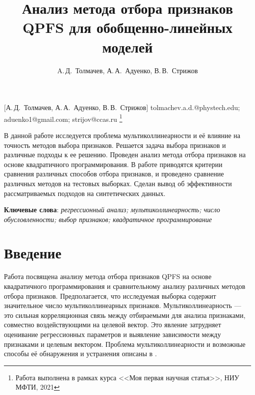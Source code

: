 \documentclass[12pt, twoside]{article}
\begin{document}
\title
    [Анализ метода отбора признаков QPFS для обобщенно-линейных моделей] %
    {Анализ метода отбора признаков QPFS для обобщенно-линейных моделей}
\author
    [A.\,Д.~Толмачев] %
    {A.\,Д.~Толмачев, А.\,А.~Адуенко, В.\,В.~Стрижов} %
    [А.\,Д.~Толмачев, А.\,А.~Адуенко, В.\,В.~Стрижов] %
\email
    {tolmachev.a.d.@phystech.edu; aduenko1@gmail.com; strijov@ccas.ru}
\thanks
    {Работа выполнена в рамках курса <<Моя первая научная статья>>, НИУ МФТИ, 2021}
    
\abstract
    {В данной работе исследуется проблема мультиколлинеарности и её влияние
    на точность методов выбора признаков. Решается задача выбора признаков и различные подходы к ее решению. Проведен анализ метода отбора признаков на основе квадратичного программирования. В работе приводятся критерии сравнения различных способов отбора признаков, и проведено сравнение различных методов на тестовых выборках.
    Сделан вывод об эффективности рассматриваемых подходов на синтетических данных.

\bigskip
\noindent
\textbf{Ключевые слова}: \emph {регрессионный анализ; мультиколлинеарность; число обусловленности; выбор признаков;  квадратичное программирование}
}


\maketitle
\linenumbers

\section{Введение}
Работа посвящена анализу метода отбора признаков QPFS на основе квадратичного программирования и сравнительному анализу различных методов отбора признаков. Предполагается, что исследуемая выборка содержит значительное число мультиколлинеарных признаков. Мультиколлинеарность — это сильная корреляционная связь между отбираемыми для анализа признаками, совместно
воздействующими на целевой вектор. Это явление затрудняет оценивание регрессионных параметров и выявление зависимости между признаками и целевым вектором. Проблема мультиколлинеарности и возможные способы её обнаружения и устранения описаны в \cite{SneeRon, Leamer, Askin}. 
\end{document}
